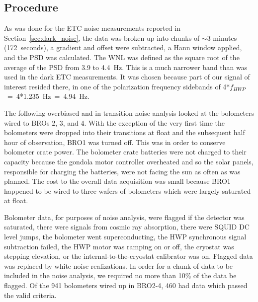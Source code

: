 \subsection{Procedure}
\label{sec:flight_procedure}



As was done for the \ac{ETC} noise measurements reported in Section~\ref{sec:dark_noise}, the data was broken up into chunks of $\sim$3 minutes (172~seconds),
a gradient and offset were subtracted, a Hann window applied, and the \ac{PSD} was calculated. 
The \ac{WNL} was defined as the square root of the average of the \ac{PSD} from 3.9 to 4.4~Hz. 
This is a much narrower band than was used in the dark \ac{ETC} measurements. 
It was chosen because part of our signal of interest resided there, in one of the polarization frequency sidebands of 4*$f_{HWP}$~=~4*1.235~Hz~=~4.94~Hz. 

The following overbiased and in-transition noise analysis looked at the bolometers wired to \ac{BRO}s 2, 3, and 4. 
With the exception of the very first time the bolometers were dropped into their transitions at float and the subsequent half hour of observation, \ac{BRO}1 was turned off. 
This was in order to conserve bolometer crate power.
The bolometer crate batteries were not charged to their capacity because the gondola motor controller overheated and so the solar panels, responsible for charging the batteries, were not facing the sun as often as was planned. 
The cost to the overall data acquisition was small because \ac{BRO}1 happened to be wired to three wafers of bolometers which were largely saturated at float. 

Bolometer data, for purposes of noise analysis, were flagged if the detector was saturated, there were signals from cosmic ray absorption, there were \ac{SQUID} DC level jumps, the bolometer went superconducting, the \ac{HWP} synchronous signal subtraction failed, the \ac{HWP} motor was ramping on or off, the cryostat was stepping elevation, or the internal-to-the-cryostat calibrator was on. 
Flagged data was replaced by white noise realizations. 
In order for a chunk of data to be included in the noise analysis, we required no more than 10\% of the data be flagged. 
Of the 941 bolometers wired up in \ac{BRO}2-4, 460 had data which passed the valid criteria. 

